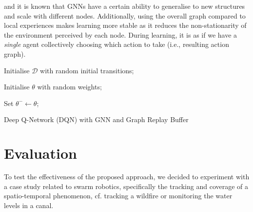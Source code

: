 \documentclass[conference]{IEEEtran}
\begin{document}
 and it is known that \acp{GNN} have a certain ability to generalise to new structures and scale with different nodes. 
% 
Additionally, 
 using the overall graph compared to local experiences makes learning more stable as it reduces the non-stationarity of the environment perceived by each node.
% 
 During learning, it is as if we have a \emph{single} agent collectively choosing which action to take (i.e., resulting action graph). 
%
\begin{algorithm}

  Initialise $\mathcal{D}$ with random initial transitions;

  Initialise $\theta$ with random weights;

  Set $\theta^{-} \leftarrow \theta$;

  \caption{Deep Q-Network (DQN) with GNN and Graph Replay Buffer}
  \label{alg:dqn}
  \end{algorithm}
    
\section{Evaluation}
\label{sec:eval}
To test the effectiveness of the proposed approach, 
 we decided to experiment with a case study related to swarm robotics, 
 specifically the tracking and coverage of a spatio-temporal phenomenon, cf. tracking a wildfire 
 or monitoring the water levels in a canal.
\end{document}
